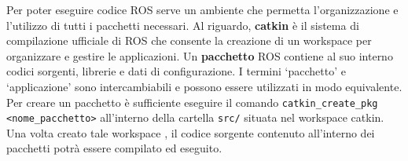 Per poter eseguire codice ROS serve un ambiente che permetta l'organizzazione e l'utilizzo di tutti i pacchetti necessari. 
Al riguardo, \textbf{catkin} \`{e} il sistema di compilazione ufficiale di ROS che consente la creazione di un workspace per 
organizzare e gestire le applicazioni. 
Un \textbf{pacchetto} ROS contiene al suo interno codici sorgenti, librerie e dati di configurazione. 
I termini `pacchetto' e `applicazione' sono intercambiabili e possono essere utilizzati in modo equivalente.
Per creare un pacchetto \`{e} sufficiente eseguire il comando 
\verb|catkin_create_pkg <nome_pacchetto>| all'interno della cartella \verb|src/| situata nel workspace catkin.
Una volta creato tale workspace \cite{catkin_ws}, il codice sorgente contenuto all'interno dei pacchetti potr\`{a} essere 
compilato ed eseguito.
